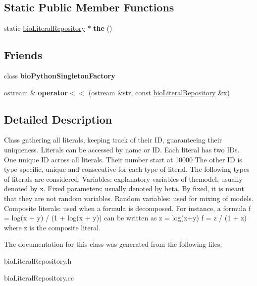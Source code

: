 \subsection*{Static Public Member Functions}
\begin{DoxyCompactItemize}
\item 
\mbox{\label{classbio_literal_repository_a5842ab390556a55acf6914bc5d7a49c8}} 
static \hyperlink{classbio_literal_repository}{bio\+Literal\+Repository} $\ast$ {\bfseries the} ()
\end{DoxyCompactItemize}
\subsection*{Friends}
\begin{DoxyCompactItemize}
\item 
\mbox{\label{classbio_literal_repository_a7112c3c569ac638826c63fda15012746}} 
class {\bfseries bio\+Python\+Singleton\+Factory}
\item 
\mbox{\label{classbio_literal_repository_a0672f69ea4978358c16a4f5de3a42d1a}} 
ostream \& {\bfseries operator$<$$<$} (ostream \&str, const \hyperlink{classbio_literal_repository}{bio\+Literal\+Repository} \&x)
\end{DoxyCompactItemize}


\subsection{Detailed Description}
Class gathering all literals, keeping track of their ID, guaranteeing their uniqueness. Literals can be accessed by name or ID. Each literal has two I\+Ds. One unique ID across all literals. Their number start at 10000 The other ID is type specific, unique and consecutive for each type of literal. The following types of literals are considered\+: Variables\+: explanatory variables of themodel, usually denoted by x. Fixed parameters\+: usually denoted by beta. By fixed, it is meant that they are not random variables. Random variables\+: used for mixing of models. Composite literals\+: used when a formula is decomposed. For instance, a formula f = log(x + y) / (1 + log(x + y)) can be written as z = log(x+y) f = z / (1 + z) where z is the composite literal. 

The documentation for this class was generated from the following files\+:\begin{DoxyCompactItemize}
\item 
bio\+Literal\+Repository.\+h\item 
bio\+Literal\+Repository.\+cc\end{DoxyCompactItemize}
